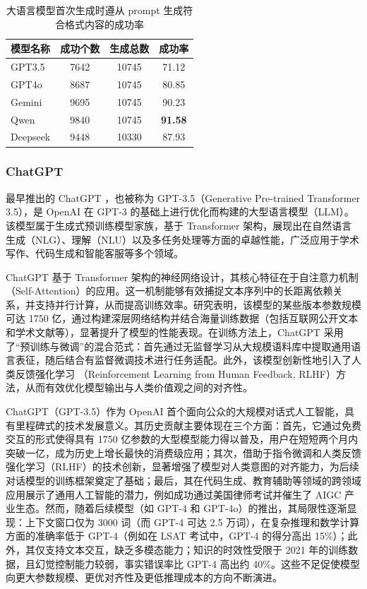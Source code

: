 \begin{table}[htbp]
    \centering
    \caption{大语言模型首次生成时遵从 prompt 生成符合格式内容的成功率}
    \begin{tabular}{l|ccc}
\toprule
\textbf{模型名称} & \textbf{成功个数} & \textbf{生成总数} & \textbf{成功率} \\
\midrule
GPT3.5   & 7642      & 10745   & 71.12 \\
GPT4o    & 8687      & 10745   & 80.85 \\
Gemini   & 9695      & 10745   & 90.23 \\
Qwen     & 9840      & 10745   & \textbf{91.58} \\
Deepseek & 9448      & 10330   & 87.93 \\
\bottomrule
    \end{tabular}
    \label{tab:construct-dataset-success-rate}
\end{table}

\subsubsection{ChatGPT}
\label{sec:TOSWT-gen-chatgpt}

最早推出的 ChatGPT \cite{chatgpt}，也被称为 GPT-3.5（Generative Pre-trained Transformer 3.5），是 OpenAI 在 GPT-3 的基础上进行优化而构建的大型语言模型（LLM）。该模型属于生成式预训练模型家族，基于 Transformer 架构，展现出在自然语言生成（NLG）、理解（NLU）以及多任务处理等方面的卓越性能，广泛应用于学术写作、代码生成和智能客服等多个领域。

ChatGPT 基于 Transformer 架构的神经网络设计，其核心特征在于自注意力机制（Self-Attention）的应用。这一机制能够有效捕捉文本序列中的长距离依赖关系，并支持并行计算，从而提高训练效率。研究表明，该模型的某些版本参数规模可达 1750 亿，通过构建深层网络结构并结合海量训练数据（包括互联网公开文本和学术文献等），显著提升了模型的性能表现。在训练方法上，ChatGPT 采用了“预训练与微调”的混合范式：首先通过无监督学习从大规模语料库中提取通用语言表征，随后结合有监督微调技术进行任务适配。此外，该模型创新性地引入了人类反馈强化学习 \cite{kaufmann2024surveyreinforcementlearninghuman}（Reinforcement Learning from Human Feedback, RLHF）方法，从而有效优化模型输出与人类价值观之间的对齐性。

ChatGPT（GPT-3.5）作为 OpenAI 首个面向公众的大规模对话式人工智能，具有里程碑式的技术发展意义。其历史贡献主要体现在三个方面：首先，它通过免费交互的形式使得具有 1750 亿参数的大型模型能力得以普及，用户在短短两个月内突破一亿，成为历史上增长最快的消费级应用；其次，借助于指令微调和人类反馈强化学习（RLHF）的技术创新，显著增强了模型对人类意图的对齐能力，为后续对话模型的训练框架奠定了基础；最后，其在代码生成、教育辅助等领域的跨领域应用展示了通用人工智能的潜力，例如成功通过美国律师考试并催生了 AIGC 产业生态。然而，随着后续模型（如 GPT-4 和 GPT-4o）的推出，其局限性逐渐显现：上下文窗口仅为 3000 词（而 GPT-4 可达 2.5 万词），在复杂推理和数学计算方面的准确率低于 GPT-4（例如在 LSAT 考试中，GPT-4 的得分高出 15\%）；此外，其仅支持文本交互，缺乏多模态能力；知识的时效性受限于 2021 年的训练数据，且幻觉控制能力较弱，事实错误率比 GPT-4 高出约 40\%。这些不足促使模型向更大参数规模、更优对齐性及更低推理成本的方向不断演进。

